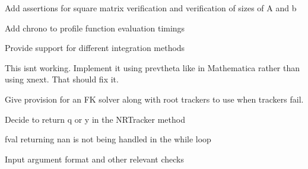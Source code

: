 
\begin{DoxyRefList}
\item[Member \mbox{\hyperlink{utils_8h_ad2246d831bd56822936b616e92e12b76}{Linear\+Solve}} (Matrix\+Xd Amat, Vector\+Xd bvec)]\label{todo__todo000005}%
%
Add assertions for square matrix verification and verification of sizes of A and b  
\item[Class \mbox{\hyperlink{classRootTracker}{Root\+Tracker}} ]\label{todo__todo000004}%
%
Add chrono to profile function evaluation timings  
\item[Member \mbox{\hyperlink{classRootTracker_a9179d3bacd501c9e052aaa4a664998a5}{Root\+Tracker::D\+M\+Tracker}} (Vector\+Xd x, Vector\+Xd xnext, Vector\+Xd y, std\+::function$<$ Matrix\+Xd(\+Vector\+Xd)$>$ Jfx, std\+::function$<$ Matrix\+Xd(\+Vector\+Xd)$>$ Jfy, double eps=0, std\+::function$<$ Vector\+Xd(\+Vector\+Xd)$>$ f=N\+U\+LL)]\label{todo__todo000003}%
%
Provide support for different integration methods 

This isnt working. Implement it using prevtheta like in Mathematica rather than using xnext. That should fix it.  
\item[Member \mbox{\hyperlink{classRootTracker_a89ffd1af75e3bf434065b736623bbf17}{Root\+Tracker::methods}} ()]\label{todo__todo000001}%
%
Give provision for an FK solver along with root trackers to use when trackers fail.  
\item[Member \mbox{\hyperlink{classRootTracker_a6bb3dcb73ea58ac44ab15d7803de3d5a}{Root\+Tracker::N\+R\+Tracker}} (Vector\+Xd x, Vector\+Xd y, std\+::function$<$ Vector\+Xd(\+Vector\+Xd)$>$ f, std\+::function$<$ Matrix\+Xd(\+Vector\+Xd)$>$ Jfy, double eps=pow(10, -\/10))]\label{todo__todo000002}%
%
Decide to return q or y in the N\+R\+Tracker method 

fval returning nan is not being handled in the while loop 

Input argument format and other relevant checks 
\end{DoxyRefList}